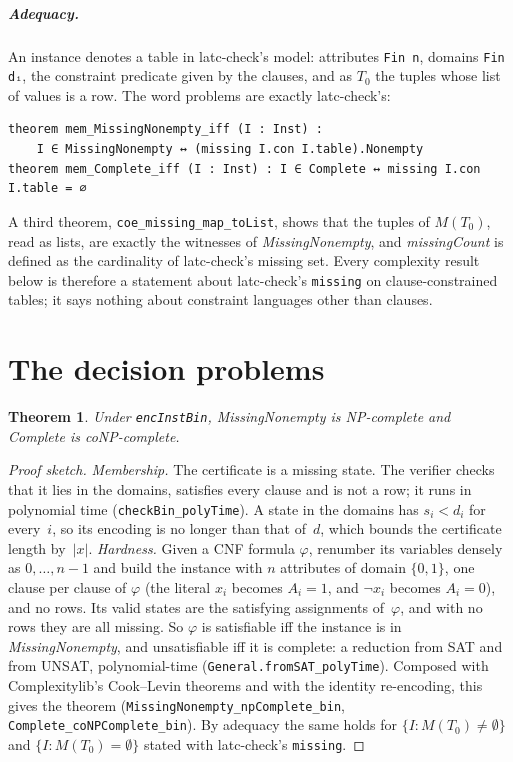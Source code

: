 \documentclass[pdflatex,sn-mathphys-num]{sn-jnl}
\theoremstyle{thmstyleone}
\newtheorem{theorem}{Theorem}
\theoremstyle{thmstylethree}
\begin{document}
\subparagraph*{Adequacy.}
An instance denotes a table in latc-check's model: attributes \lstinline{Fin n}, domains
\lstinline{Fin dᵢ}, the constraint predicate given by the clauses, and as $T_0$ the tuples whose
list of values is a row. The word problems are exactly latc-check's:
\begin{lstlisting}
theorem mem_MissingNonempty_iff (I : Inst) :
    I ∈ MissingNonempty ↔ (missing I.con I.table).Nonempty
theorem mem_Complete_iff (I : Inst) : I ∈ Complete ↔ missing I.con I.table = ∅
\end{lstlisting}
A third theorem, \lstinline{coe_missing_map_toList}, shows that the tuples of $M(T_0)$, read as
lists, are exactly the witnesses of \textit{MissingNonempty}, and \textit{missingCount} is
defined as the cardinality of latc-check's missing set. Every complexity result below is
therefore a statement about latc-check's \lstinline{missing} on clause-constrained tables; it
says nothing about constraint languages other than clauses.

\section{The decision problems}
\label{sec:decision}

\begin{theorem}
\label{thm:decision}
Under \lstinline{encInstBin}, \textit{MissingNonempty} is NP-complete and \textit{Complete} is
coNP-complete.
\end{theorem}

\begin{proof}[Proof sketch]
\emph{Membership.} The certificate is a missing state. The verifier checks that it lies in the
domains, satisfies every clause and is not a row; it runs in polynomial time
(\lstinline{checkBin_polyTime}). A state in the domains has $s_i < d_i$ for every~$i$, so its
encoding is no longer than that of~$d$, which bounds the certificate length by~$|x|$.
\emph{Hardness.} Given a CNF formula $\varphi$, renumber its variables densely as
$0, \dots, n-1$ and build the instance with $n$ attributes of domain $\{0,1\}$, one clause per
clause of $\varphi$ (the literal $x_i$ becomes $A_i = 1$, and $\lnot x_i$ becomes $A_i = 0$), and
no rows. Its valid states are the satisfying assignments of~$\varphi$, and with no rows they are
all missing. So $\varphi$ is satisfiable iff the instance is in \textit{MissingNonempty}, and
unsatisfiable iff it is complete: a reduction from SAT and from UNSAT, polynomial-time
(\lstinline{General.fromSAT_polyTime}). Composed with Complexitylib's Cook--Levin theorems and with the
identity re-encoding, this gives the theorem (\lstinline{MissingNonempty_npComplete_bin},
\lstinline{Complete_coNPComplete_bin}). By adequacy the same holds for
$\{I : M(T_0) \neq \emptyset\}$ and $\{I : M(T_0) = \emptyset\}$ stated with latc-check's
\lstinline{missing}.
\end{proof}
\end{document}
